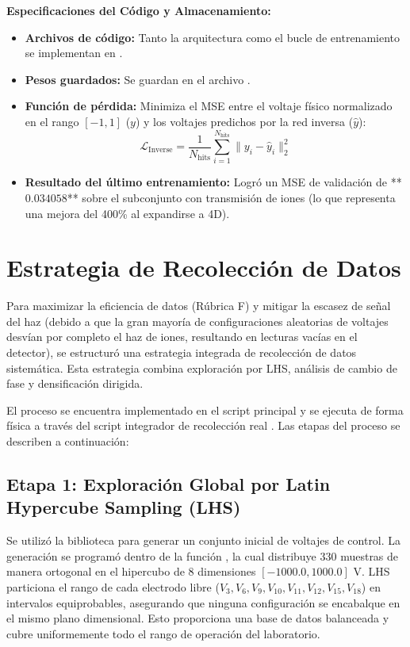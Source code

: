 \documentclass[12pt,letterpaper]{article}
\begin{document}
\textbf{Especificaciones del Código y Almacenamiento:}
\begin{itemize}
    \item \textbf{Archivos de código:} Tanto la arquitectura como el bucle de entrenamiento se implementan en .
    \item \textbf{Pesos guardados:} Se guardan en el archivo .
    \item \textbf{Función de pérdida:} Minimiza el MSE entre el voltaje físico normalizado en el rango $[-1, 1]$ ($y$) y los voltajes predichos por la red inversa ($\hat{y}$):
    \begin{equation}
        \mathcal{L}_{\text{Inverse}} = \frac{1}{N_{\text{hits}}} \sum_{i=1}^{N_{\text{hits}}} \|y_i - \hat{y}_i\|_2^2
    \end{equation}
    \item \textbf{Resultado del último entrenamiento:} Logró un MSE de validación de **$0.034058$** sobre el subconjunto con transmisión de iones (lo que representa una mejora del 400\% al expandirse a 4D).
\end{itemize}

\newpage
\section{Estrategia de Recolección de Datos}
Para maximizar la eficiencia de datos (Rúbrica F) y mitigar la escasez de señal del haz (debido a que la gran mayoría de configuraciones aleatorias de voltajes desvían por completo el haz de iones, resultando en lecturas vacías en el detector), se estructuró una estrategia integrada de recolección de datos sistemática. Esta estrategia combina exploración por LHS, análisis de cambio de fase y densificación dirigida.

El proceso se encuentra implementado en el script principal  y se ejecuta de forma física a través del script integrador de recolección real . Las etapas del proceso se describen a continuación:

\subsection{Etapa 1: Exploración Global por Latin Hypercube Sampling (LHS)}
Se utilizó la biblioteca  para generar un conjunto inicial de voltajes de control. La generación se programó dentro de la función , la cual distribuye $330$ muestras de manera ortogonal en el hipercubo de 8 dimensiones $[-1000.0, 1000.0]\text{ V}$. LHS particiona el rango de cada electrodo libre ($V_3, V_6, V_9, V_{10}, V_{11}, V_{12}, V_{15}, V_{18}$) en intervalos equiprobables, asegurando que ninguna configuración se encabalque en el mismo plano dimensional. Esto proporciona una base de datos balanceada y cubre uniformemente todo el rango de operación del laboratorio.
\end{document}
